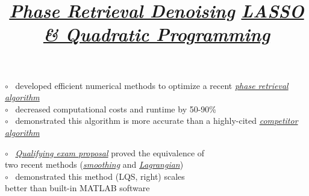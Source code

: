 \documentclass[12pt,margintitle,line]{res}
\begin{document}
\begin{resume}
\vspace{-0.5cm}
\title{
\href{https://github.com/Will-Wright/low-rank-opt-rapid-eig} {\textsl{Phase Retrieval Denoising}}
}
\employer{ 
}
\dates{}
\begin{position}
	
\vspace{-1.25cm}
$\circ$ \ developed efficient numerical methods to optimize a recent \href{https://arxiv.org/abs/1508.00315}{\textit{phase retrieval algorithm}}
	\\
$\circ$ \ decreased computational costs and runtime by 50-90\%
	\\
$\circ$ \ demonstrated this algorithm is more accurate than a highly-cited \href{https://arxiv.org/abs/1407.1065}{\textit{competitor algorithm}}
\end{position}





\vspace{-0.5cm}
\title{
\href{https://github.com/Will-Wright/lasso-quadratic-solver} {\textsl{LASSO \& Quadratic Programming}}
}
\employer{ 
}
\dates{}
\begin{position}
	
	\begin{figure} 
		\vspace{-1.40cm}
		\hspace{-3.70cm}
 	 	\begin{minipage}[t]{3cm}
  		\end{minipage} 
	\end{figure} 	
	
\vspace{-1.25cm}
$\circ$ \ 
\href{https://github.com/Will-Wright/lasso-quadratic-solver/blob/master/will_wright_qualifying_exam_proposal.pdf}{\textit{Qualifying exam proposal}} 
proved the equivalence of 
	\\ 	\hspace*{0.35cm} 
two recent methods 
(\href{https://link.springer.com/article/10.1007/s10589-017-9912-y}{\textit{smoothing}} 
and
\href{https://academic.oup.com/imajna/article/37/4/1635/3059683}{\textit{Lagrangian}})
	\\
$\circ$ \ demonstrated this method (LQS, right) scales
	\\		\hspace*{0.35cm} 
better than built-in MATLAB software
\end{position}








\end{resume}
\end{document}
